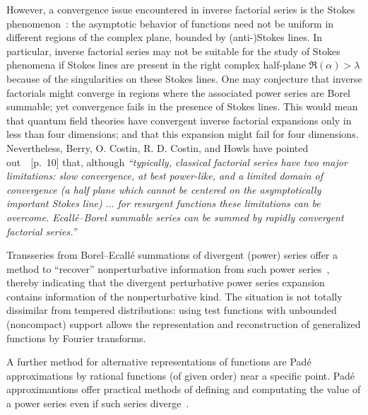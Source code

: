 \documentclass[axioms,article,accept,oneauthor,pdftex]{Definitions/mdpi}
\begin{document}
However, a convergence issue encountered in inverse factorial series is the Stokes phenomenon~\cite{Costin2016Aug,Costin_Dunne_2017}:
the asymptotic behavior of functions need not be uniform in different regions of the complex plane, bounded by (anti-)Stokes lines.
In particular, inverse factorial series may not be suitable for the study of Stokes phenomena if Stokes lines
are present in the right complex half-plane $\Re ( \alpha ) > \lambda $ because of the singularities on these Stokes lines.
One may conjecture that inverse factorials might converge in regions where the associated power series are Borel summable;
yet convergence fails in the presence of Stokes lines.
This would mean that quantum field theories have convergent inverse factorial expansions only in less than four dimensions;
and that this expansion might fail for four dimensions.
Nevertheless, Berry, O. Costin, R. D. Costin, and Howls have pointed out~\cite{costin2016}~[p.~10] that,
although {\it ``typically, classical factorial series have two major limitations: slow
convergence, at best power-like, and a limited domain of convergence (a half
plane which cannot be centered on the asymptotically important Stokes line) $\ldots$
for resurgent functions these limitations can be overcome. Ecall\'e--Borel summable series can be summed by rapidly convergent factorial series.''}

Transseries from Borel--Ecall\'e summations of divergent (power) series offer a method to ``recover''
nonperturbative information from such power series~\cite{Costin_1995,Edgar-2009},
thereby indicating that the divergent perturbative power series expansion contains information of the nonperturbative kind.
The situation is not totally dissimilar from tempered distributions: using test functions with unbounded (noncompact) support
allows the representation and reconstruction of generalized functions by Fourier transforms.


A further method for alternative representations of functions are Pad\'e approximations
by rational functions (of given order) near a specific point.
Pad\'e approximantions offer practical methods of defining
and computating the value of a power series even if such series diverge~\cite{baker_graves-morris_1996}.


\end{document}
